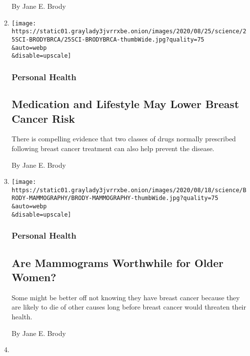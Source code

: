 \begin{enumerate}
  By Jane E. Brody
\item
  \href{/2020/08/24/well/live/breast-cancer-prevention.html}{}

  \texttt{[image: https://static01.graylady3jvrrxbe.onion/images/2020/08/25/science/25SCI-BRODYBRCA/25SCI-BRODYBRCA-thumbWide.jpg?quality=75\\\&auto=webp\\\&disable=upscale]}

  \hypertarget{personal-health-2}{%
  \subsubsection{Personal Health}\label{personal-health-2}}

  \hypertarget{medication-and-lifestyle-may-lower-breast-cancer-risk}{%
  \subsection{Medication and Lifestyle May Lower Breast Cancer
  Risk}\label{medication-and-lifestyle-may-lower-breast-cancer-risk}}

  There is compelling evidence that two classes of drugs normally
  prescribed following breast cancer treatment can also help prevent the
  disease.

  By Jane E. Brody
\item
  \href{/2020/08/17/well/live/mammograms-older-women.html}{}

  \texttt{[image: https://static01.graylady3jvrrxbe.onion/images/2020/08/18/science/BRODY-MAMMOGRAPHY/BRODY-MAMMOGRAPHY-thumbWide.jpg?quality=75\\\&auto=webp\\\&disable=upscale]}

  \hypertarget{personal-health-3}{%
  \subsubsection{Personal Health}\label{personal-health-3}}

  \hypertarget{are-mammograms-worthwhile-for-older-women}{%
  \subsection{Are Mammograms Worthwhile for Older
  Women?}\label{are-mammograms-worthwhile-for-older-women}}

  Some might be better off not knowing they have breast cancer because
  they are likely to die of other causes long before breast cancer would
  threaten their health.

  By Jane E. Brody
\item
  \href{/2020/08/10/well/live/pesticides-insecticides-pyrethroids-heart-disease.html}{}


\end{enumerate}
